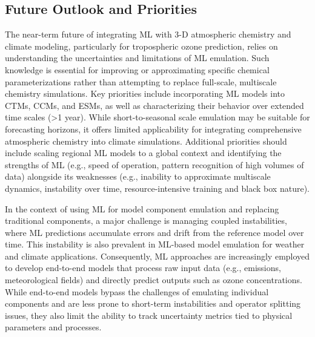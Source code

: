 \documentclass[gmd, manuscript]{copernicus}
\begin{document}
\subsection{Future Outlook and Priorities}

The near-term future of integrating ML with 3-D atmospheric chemistry and climate modeling, particularly for tropospheric ozone prediction, relies on understanding the uncertainties and limitations of ML emulation. Such knowledge is essential for improving or approximating specific chemical parameterizations rather than attempting to replace full-scale, multiscale chemistry simulations. Key priorities include incorporating ML models into CTMs, CCMs, and ESMs, as well as characterizing their behavior over extended time scales (>1 year). While short-to-seasonal scale emulation may be suitable for forecasting horizons, it offers limited applicability for integrating comprehensive atmospheric chemistry into climate simulations. Additional priorities should include scaling regional ML models to a global context and identifying the strengths of ML (e.g., speed of operation, pattern recognition of high volumes of data) alongside its weaknesses (e.g., inability to approximate multiscale dynamics, instability over time, resource-intensive training and black box nature). 

In the context of using ML for model component emulation and replacing traditional components, a major challenge is managing coupled instabilities, where ML predictions accumulate errors and drift from the reference model over time. This instability is also prevalent in ML-based model emulation for weather and climate applications. Consequently, ML approaches are increasingly employed to develop end-to-end models that process raw input data (e.g., emissions, meteorological fields) and directly predict outputs such as ozone concentrations. While end-to-end models bypass the challenges of emulating individual components and are less prone to short-term instabilities and operator splitting issues, they also limit the ability to track uncertainty metrics tied to physical parameters and processes. 
\end{document}
